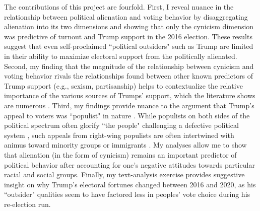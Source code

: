 \documentclass[12pt]{article}
\begin{document}
The contributions of this project are fourfold. First, I reveal nuance in the relationship between political alienation and voting behavior by disaggregating alienation into its two dimensions and showing that only the cynicism dimension was predictive of turnout and Trump support in the 2016 election. These results suggest that even self-proclaimed ``political outsiders" such as Trump are limited in their ability to maximize electoral support from the politically alienated. Second, my finding that the magnitude of the relationship between cynicism and voting behavior rivals the relationships found between other known predictors of Trump support (e.g., sexism, partisanship) helps to contextualize the relative importance of the various sources of Trumps' support, which the literature shows are numerous \parencite{enders2021modeling}. Third, my findings provide nuance to the argument that Trump's appeal to voters was ``populist" in nature \parencite{brewer2016populism,inglehart2017trump}. While populists on both sides of the political spectrum often glorify ``the people" challenging a defective political system \parencite{mudde2004populist}, such appeals from right-wing populists are often intertwined with animus toward minority groups or immigrants \parencite{lacatus2019populism}. My analyses allow me to show that alienation (in the form of cynicism) remains an important predictor of political behavior after accounting for one's negative attitudes towards particular racial and social groups. Finally, my text-analysis exercise provides suggestive insight on why Trump's electoral fortunes changed between 2016 and 2020, as his ``outsider" qualities seem to have factored less in peoples' vote choice during his re-election run. 
















\end{document}
